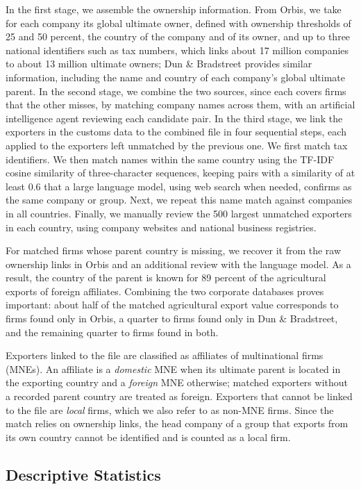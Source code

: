 \documentclass[11pt,a4paper]{article}
\begin{document}
In the first stage, we assemble the ownership information. From Orbis, we take for each company
its global ultimate owner, defined with ownership thresholds of 25 and 50 percent, the country of
the company and of its owner, and up to three national identifiers such as tax numbers, which links
about 17 million companies to about 13 million ultimate owners; Dun \& Bradstreet provides similar
information, including the name and country of each company's global ultimate parent. In the
second stage, we combine the two sources, since each covers firms that the other misses, by
matching company names across them, with an artificial intelligence agent reviewing each
candidate pair. In the third stage, we link the exporters in the customs data to the combined file
in four sequential steps, each applied to the exporters left unmatched by the previous one. We
first match tax identifiers. We then match names within the same country using the TF-IDF cosine
similarity of three-character sequences, keeping pairs with a similarity of at least 0.6 that a
large language model, using web search when needed, confirms as the same company or group. Next, we
repeat this name match against companies in all countries. Finally, we manually review the 500
largest unmatched exporters in each country, using company websites and national business
registries.

For matched firms whose parent country is missing, we recover it from the raw ownership links in
Orbis and an additional review with the language model. As a result, the country of the parent is
known for 89 percent of the agricultural exports of foreign affiliates. Combining the two
corporate databases proves important: about half of the matched agricultural export value
corresponds to firms found only in Orbis, a quarter to firms found only in Dun \& Bradstreet, and
the remaining quarter to firms found in both.

Exporters linked to the file are classified as affiliates of multinational firms (MNEs). An
affiliate is a \emph{domestic} MNE when its ultimate parent is located in the exporting country
and a \emph{foreign} MNE otherwise; matched exporters without a recorded parent country are treated
as foreign. Exporters that cannot be linked to the file are \emph{local} firms, which we also refer
to as non-MNE firms. Since the match relies on ownership links, the head company of a group that
exports from its own country cannot be identified and is counted as a local firm.

\subsection{Descriptive Statistics}\label{sec:data_desc}
\end{document}
